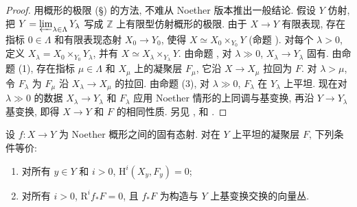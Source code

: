 \begin{proof}
用概形的极限 (\S{}) 的方法, 不难从 Noether 版本推出一般结论. 假设 $Y$ 仿射, 把 $Y=\varprojlim_{\lambda\in\Lambda}Y_\lambda$ 写成 $\mathbb Z$ 上有限型仿射概形的极限. 由于 $X\to Y$ 有限表现, 存在指标 $0\in\Lambda$ 和有限表现态射 $X_0\to Y_0$, 使得 $X\simeq X_0\times_{Y_0}Y$ (命题 ). 对每个 $\lambda>0$, 定义 $X_\lambda=X_0\times_{Y_0}Y_\lambda$, 并有 $X\simeq X_\lambda\times_{Y_\lambda}Y$. 由命题 , 对 $\lambda\gg0$, $X_\lambda\to Y_\lambda$ 固有. 由命题 (1), 存在指标 $\mu\in\Lambda$ 和 $X_\mu$ 上的凝聚层 $F_\mu$, 它沿 $X\to X_\mu$ 拉回为 $F$. 对 $\lambda>\mu$, 令 $F_\lambda$ 为 $F_\mu$ 沿 $X_\lambda\to X_\mu$ 的拉回. 由命题 (3), 对 $\lambda\gg0$, $F_\lambda$ 在 $Y_\lambda$ 上平坦. 现在对 $\lambda\gg0$ 的数据 $X_\lambda\to Y_\lambda$ 和 $F_\lambda$ 应用 Noether 情形的上同调与基变换, 再沿 $Y\to Y_\lambda$ 基变换, 即得 $X\to Y$ 和 $F$ 的相同性质. 另见 \cite[III$_2$.$7.7.5$, III$_2$.$7.7.10$, III$_2$.$7.8.4$]{EGA}, \cite[定理 $12.11$]{Har77} 和 \cite[定理 $25.1.6$]{Vak17}.
\end{proof}
\begin{exercise}[简单而有益的练习]\label{src:A.6.10}
设 $f:X\to Y$ 为 Noether 概形之间的固有态射. 对在 $Y$ 上平坦的凝聚层 $F$, 下列条件等价:
\begin{enumerate}[(1)]
\item 对所有 $y\in Y$ 和 $i>0$, $\mathrm H^i(X_y,F_y)=0$;
\item 对所有 $i>0$, $\mathrm R^if_*F=0$, 且 $f_*F$ 为构造与 $Y$ 上基变换交换的向量丛.
\end{enumerate}
\end{exercise}
